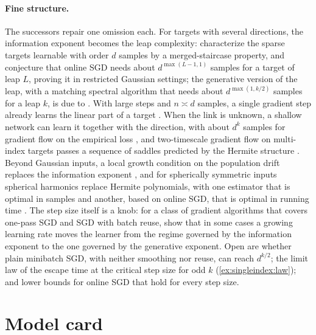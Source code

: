 \begin{refsection}
\paragraph{Fine structure.}
The successors repair one omission each. For targets with several directions, the information exponent becomes the leap complexity: \textcite{AbbeBoixAdseraMisiakiewicz2022} characterize the sparse targets learnable with order $d$ samples by a merged-staircase property, and \textcite{AbbeBoixAdseraMisiakiewicz2023} conjecture that online SGD needs about $d^{\max(L-1,1)}$ samples for a target of leap $L$, proving it in restricted Gaussian settings; the generative version of the leap, with a matching spectral algorithm that needs about $d^{\max(1,k/2)}$ samples for a leap $k$, is due to \textcite{DamianLeeBruna2025}. With large steps and $n\asymp d$ samples, a single gradient step already learns the linear part of a target \parencite{BaEtAl2022}. When the link is unknown, a shallow network can learn it together with the direction, with about $d^{k}$ samples for gradient flow on the empirical loss \parencite{BiettiEtAl2022}, and two-timescale gradient flow on multi-index targets passes a sequence of saddles predicted by the Hermite structure \parencite{BiettiBrunaPillaudVivien2025}. Beyond Gaussian inputs, a local growth condition on the population drift replaces the information exponent \parencite{ZweigEtAl2023}, and for spherically symmetric inputs spherical harmonics replace Hermite polynomials, with one estimator that is optimal in samples and another, based on online SGD, that is optimal in running time \parencite{JoshiEtAl2025}. The step size itself is a knob: for a class of gradient algorithms that covers one-pass SGD and SGD with batch reuse, \textcite{TsiolisMousaviHosseiniErdogdu2025} show that in some cases a growing learning rate moves the learner from the regime governed by the information exponent to the one governed by the generative exponent. Open are whether plain minibatch SGD, with neither smoothing nor reuse, can reach $d^{k/2}$; the limit law of the escape time at the critical step size for odd $k$ (\cref{ex:singleindex:law}); and lower bounds for online SGD that hold for every step size.

\section{Model card}\label{sec:singleindex:card}


\end{refsection}
